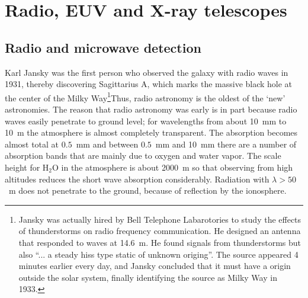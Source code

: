 %
\chapter{Radio, EUV and X-ray telescopes}

\section{Radio and microwave detection}

Karl Jansky was the first person who observed the galaxy with radio waves in 
1931, thereby discovering Sagittarius A, which marks the massive black hole 
at the center of the Milky Way\footnote{Jansky was actually hired by
  Bell Telephone Labarotories to study the effects of thunderstorms on
  radio frequency communication. He designed an antenna that responded
  to waves at 14.6~m. He found signals from thunderstorms but also
  ``... a steady hiss type static of unknown origing''. The source
  appeared 4 minutes earlier every day, and Jansky concluded that it
  must have a origin outside the solar system, finally identifying the
  source as Milky Way in 1933.}Thus, radio astronomy is the 
oldest of the `new' astronomies. The reason
that radio astronomy was early is in part because radio waves easily penetrate
to ground level; for wavelengths from about 10~mm to 10~m the atmosphere is
almost completely transparent. The absorption becomes almost total at 
$0.5$~mm and between $0.5$~mm and 10~mm there are a number of absorption bands
that are mainly due to oxygen and water vapor. The scale height for H$_2$O 
in the atmosphere is about 2000~m so that observing from high altitudes 
reduces the short wave absorption considerably. Radiation with $\lambda>50$~m
does not penetrate to the ground, because of reflection by the ionosphere.


